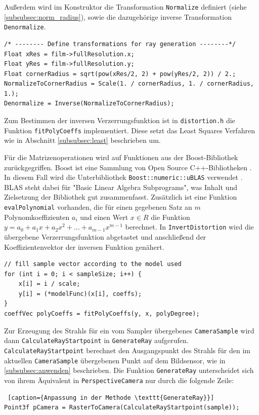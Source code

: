 Außerdem wird im Konstruktor die Transformation \texttt{Normalize} definiert (siehe \ref{subsubsec:norm_radius}), sowie die dazugehörige inverse Transformation \texttt{Denormalize}.
\newpage
\begin{lstlisting}[caption={Transformation zur Normalisierung der Pixelkoordinaten}]
/* -------- Define transformations for ray generation --------*/
Float xRes = film->fullResolution.x;
Float yRes = film->fullResolution.y;
Float cornerRadius = sqrt(pow(xRes/2, 2) + pow(yRes/2, 2)) / 2.;
NormalizeToCornerRadius = Scale(1. / cornerRadius, 1. / cornerRadius, 1.);
Denormalize = Inverse(NormalizeToCornerRadius);
\end{lstlisting}

Zum Bestimmen der inversen Verzerrungsfunktion ist in \texttt{distortion.h} die Funktion \texttt{fitPolyCoeffs} implementiert. Diese setzt das Least Squares Verfahren wie in Abschnitt \ref{subsubsec:least} beschrieben um.

Für die Matrizenoperationen wird auf Funktionen aus der Boost-Bibliothek zurückgegriffen. Boost ist eine Sammlung von Open Source C++-Bibliotheken \cite{boost}. In diesem Fall wird die Unterbibliothek \texttt{Boost::numeric::uBLAS} verwendet \cite{ublas}. BLAS steht dabei für "Basic Linear Algebra Subprograms", was Inhalt und Zielsetzung der Bibliothek gut zusammenfasst. Zusätzlich ist eine Funktion \texttt{evalPolynomial} vorhanden, die für einen gegebenen Satz an $m$ Polynomkoeffizienten $a_i$ und einen Wert $x \in R$ die Funktion $y = a_0 + a_1 x + a_2 x^2 + \dots + a_{m-1} x^{m-1}$ berechnet. In \texttt{InvertDistortion} wird die übergebene Verzerrungsfunktion abgetastet und anschließend der Koeffizientenvektor der inversen Funktion genähert.
\begin{lstlisting}[caption={"Abtasten" des Verzerrungsmodells und Invertierung}]
// fill sample vector according to the model used
for (int i = 0; i < sampleSize; i++) {
	x[i] = i / scale;
	y[i] = (*modelFunc)(x[i], coeffs);
}
coeffVec polyCoeffs = fitPolyCoeffs(y, x, polyDegree);
\end{lstlisting}

Zur Erzeugung des Strahls für ein vom Sampler übergebenes \texttt{CameraSample} wird dann \texttt{CalculateRayStartpoint} in \texttt{GenerateRay} aufgerufen. \texttt{CalculateRayStartpoint} berechnet den Ausgangspunkt des Strahls für den im aktuellen \texttt{CameraSample} übergebenen Punkt auf dem Bildsensor, wie in \ref{subsubsec:anwenden} beschrieben. Die Funktion \texttt{GenerateRay} unterscheidet sich von ihrem Äquivalent in \texttt{PerspectiveCamera} nur durch die folgende Zeile:
\begin{lstlisting} [caption={Anpassung in der Methode \texttt{GenerateRay}}]
Point3f pCamera = RasterToCamera(CalculateRayStartpoint(sample));
\end{lstlisting}

